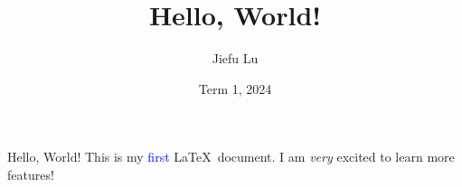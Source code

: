 \documentclass[12pt]{article}
\title{Hello, World!}
\author{Jiefu Lu}
\date{Term 1, 2024}
\begin{document}
\maketitle
Hello, World! This is my \textcolor{blue}{first} \LaTeX\ document. 
I am \emph{very} excited to learn more features!
\end{document}
